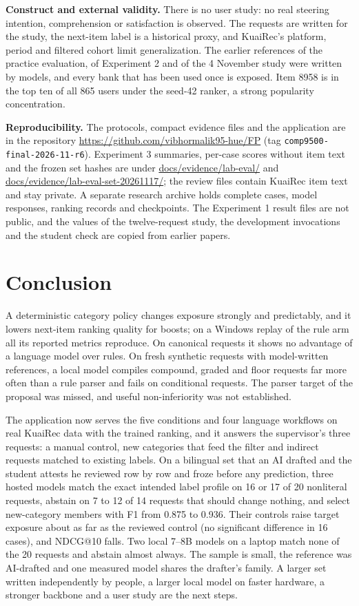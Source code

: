 \documentclass[conference]{IEEEtran}
\begin{document}
\textbf{Construct and external validity.} There is no user study: no real steering intention, comprehension or satisfaction is observed. The requests are written for the study, the next-item label is a historical proxy, and KuaiRec's platform, period and filtered cohort limit generalization. The earlier references of the practice evaluation, of Experiment 2 and of the 4 November study were written by models, and every bank that has been used once is exposed. Item 8958 is in the top ten of all 865 users under the seed-42 ranker, a strong popularity concentration.

\textbf{Reproducibility.} The protocols, compact evidence files and the application are in the repository \url{https://github.com/vibhormalik95-hue/FP} (tag \texttt{comp9500-final-2026-11-r6}). Experiment 3 summaries, per-case scores without item text and the frozen set hashes are under \url{docs/evidence/lab-eval/} and \url{docs/evidence/lab-eval-set-20261117/}; the review files contain KuaiRec item text and stay private. A separate research archive holds complete cases, model responses, ranking records and checkpoints. The Experiment 1 result files are not public, and the values of the twelve-request study, the development invocations and the student check are copied from earlier papers.

\section{Conclusion}
A deterministic category policy changes exposure strongly and predictably, and it lowers next-item ranking quality for boosts; on a Windows replay of the rule arm all its reported metrics reproduce. On canonical requests it shows no advantage of a language model over rules. On fresh synthetic requests with model-written references, a local model compiles compound, graded and floor requests far more often than a rule parser and fails on conditional requests. The parser target of the proposal was missed, and useful non-inferiority was not established.

The application now serves the five conditions and four language workflows on real KuaiRec data with the trained ranking, and it answers the supervisor's three requests: a manual control, new categories that feed the filter and indirect requests matched to existing labels. On a bilingual set that an AI drafted and the student attests he reviewed row by row and froze before any prediction, three hosted models match the exact intended label profile on 16 or 17 of 20 nonliteral requests, abstain on 7 to 12 of 14 requests that should change nothing, and select new-category members with F1 from 0.875 to 0.936. Their controls raise target exposure about as far as the reviewed control (no significant difference in 16 cases), and NDCG@10 falls. Two local 7--8B models on a laptop match none of the 20 requests and abstain almost always. The sample is small, the reference was AI-drafted and one measured model shares the drafter's family. A larger set written independently by people, a larger local model on faster hardware, a stronger backbone and a user study are the next steps.



\end{document}
